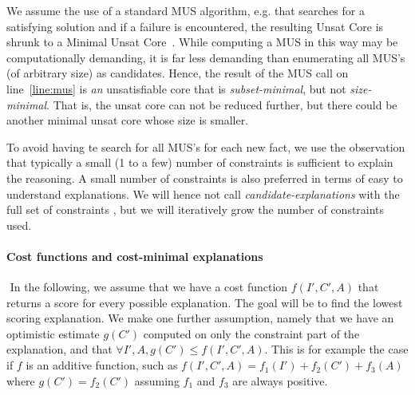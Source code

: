 

We assume the use of a standard MUS algorithm, e.g. that searches for a satisfying solution and if a failure is encountered, the resulting Unsat Core is shrunk to a Minimal Unsat Core~\cite{}. While computing a MUS in this way may be computationally demanding, it is far less demanding than enumerating all MUS's (of arbitrary size) as candidates. 
Hence, the result of the MUS call on line~\ref{line:mus} is \textit{an} unsatisfiable core that is \textit{subset-minimal}, but not \textit{size-minimal}. That is, the unsat core can not be reduced further, but there could be another minimal unsat core whose size is smaller.


To avoid having te search for all MUS's for each new fact, we use the observation that typically a small (1 to a few) number of constraints is sufficient to explain the reasoning. A small number of constraints is also preferred in terms of easy to understand explanations. We will hence not call \textit{candidate-explanations} with the full set of constraints \allconstraints, but we will iteratively grow the number of constraints used. 

\paragraph{Cost functions and cost-minimal explanations}
$ $   
In the following, we assume that we have a cost function $f(I', C', A)$ that returns a score for every possible explanation. The goal will be to find the lowest scoring explanation. We make one further assumption, namely that we have an optimistic estimate $g(C')$ computed on only the constraint part of the explanation, and that $\forall I', A, g(C') \leq f(I', C', A)$. This is for example the case if $f$ is an additive function, such as $f(I', C', A) = f_1(I') + f_2(C') + f_3(A)$ where $g(C') = f_2(C')$ assuming $f_1$ and $f_3$ are always positive.

